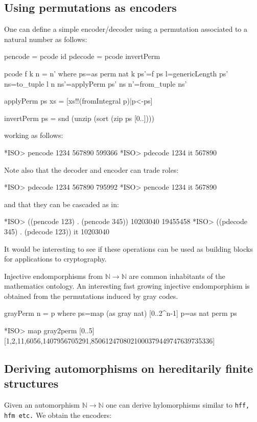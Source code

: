 \documentclass[]{INCLUDES/llncs}
\begin{document}
\subsection{Using permutations as encoders}

One can define a simple encoder/decoder using a permutation associated to a
natural number as follows:
\begin{code}
pencode = pcode id
pdecode = pcode invertPerm

pcode f k n = n' where
  ps=as perm nat k
  ps'=f ps
  l=genericLength ps'
  ns=to_tuple l n
  ns'=applyPerm ps' ns
  n'=from_tuple ns'
  
applyPerm ps xs = [xs!!(fromIntegral p)|p<-ps]

invertPerm ps = snd (unzip (sort (zip ps [0..])))
\end{code}
working as follows:
\begin{codex}
*ISO> pencode 1234 567890 
599366
*ISO> pdecode 1234 it
567890
\end{codex}
Note also that the decoder and encoder can trade roles:
\begin{codex}
*ISO> pdecode 1234 567890
795992
*ISO> pencode 1234 it
567890
\end{codex}
and that they can be cascaded as in:
\begin{codex}
*ISO> ((pencode 123) . (pencode 345))  10203040
19455458
*ISO> ((pdecode 345) . (pdecode 123))  it
10203040
\end{codex}
It would be interesting to see if these operations can be used as building
blocks for applications to cryptography.

Injective endomporphisms from $\mathbb{N} \to \mathbb{N}$ are common inhabitants
of the mathematics ontology.
An interesting fast growing injective endomporphism is obtained from the
permutations induced by gray codes.
\begin{code}
grayPerm n = p where 
  ps=map (as gray nat) [0..2^n-1]
  p=as nat perm ps
\end{code}
\begin{codex}
*ISO> map gray2perm [0..5]
[1,2,11,6056,1407956705291,8506124708021000379449747639735336]
\end{codex}

\subsection{Deriving automorphisms on hereditarily finite structures}

Given an automorphism  $\mathbb{N} \to \mathbb{N}$ one can derive
hylomorphisms similar to {\tt hff, hfm etc.} We obtain the encoders:
\end{document}

